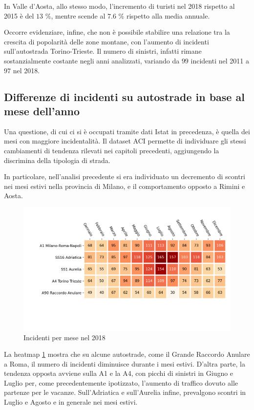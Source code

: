 \documentclass[a4paper,12pt]{report}
\begin{document}
In Valle d'Aosta, allo stesso modo, l'incremento di turisti nel 2018 
rispetto al 2015 è del $13$ \%, mentre scende al $7.6$ \% rispetto alla media annuale. 

Occorre evidenziare, infine, che non è possibile stabilire una relazione 
tra la crescita di popolarità delle zone montane, 
con l'aumento di incidenti sull'autostrada Torino-Trieste. 
Il numero di sinistri, infatti rimane sostanzialmente costante negli anni analizzati, 
variando da $99$ incidenti nel 2011 a $97$ nel 2018. 

\subsection{Differenze di incidenti su autostrade in base al mese dell'anno}

Una questione, di cui ci si è occupati tramite dati Istat in precedenza, è 
quella dei mesi con maggiore incidentalità. 
Il dataset ACI permette di individuare gli stessi cambiamenti di tendenza rilevati nei 
capitoli precedenti, aggiungendo la discrimina della tipologia di strada. 

In particolare, nell'analisi precedente si era individuato un decremento di scontri 
nei mesi estivi nella provincia di Milano, e il comportamento opposto a 
Rimini e Aosta. 

\begin{figure}
    \includegraphics[width=\linewidth]{../src/incidenti/incidenti_aci/autostrade/mesi_autostrade.png}
    \caption{Incidenti per mese nel 2018}
    \label{fig:incidenti-per-mese}
\end{figure}

La heatmap \ref{fig:incidenti-per-mese} mostra che su alcune autostrade, come il 
Grande Raccordo Anulare a Roma, il numero di incidenti diminuisce durante i mesi 
estivi. 
D'altra parte, la tendenza opposta avviene sulla A1 e la A4, 
con picchi di sinistri in Giugno e Luglio per, come precedentemente ipotizzato, 
l'aumento di traffico dovuto alle partenze per le vacanze. 
Sull'Adriatica e sull'Aurelia infine, prevalgono scontri 
in Luglio e Agosto e in generale nei mesi estivi. 
\end{document}

